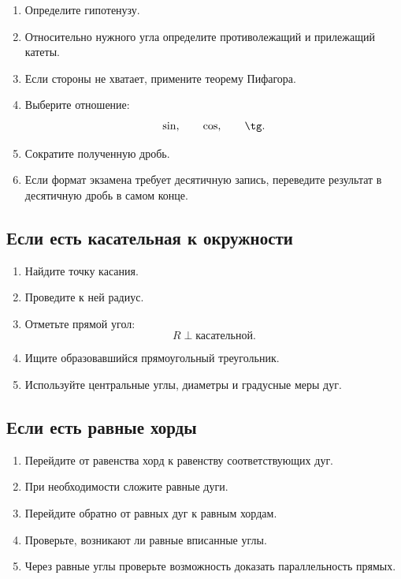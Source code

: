 \documentclass[a4paper,12pt]{article}
\begin{document}
\begin{enumerate}

  \item Определите гипотенузу.

  \item Относительно нужного угла определите
  противолежащий и прилежащий катеты.

  \item Если стороны не хватает,
  примените теорему Пифагора.

  \item Выберите отношение:
  \[
  \sin,\qquad \cos,\qquad \tg.
  \]

  \item Сократите полученную дробь.

  \item Если формат экзамена требует десятичную запись,
  переведите результат в десятичную дробь в самом конце.

\end{enumerate}

\subsection*{Если есть касательная к окружности}

\begin{enumerate}

  \item Найдите точку касания.

  \item Проведите к ней радиус.

  \item Отметьте прямой угол:
  \[
  R\perp\text{касательной}.
  \]

  \item Ищите образовавшийся прямоугольный треугольник.

  \item Используйте центральные углы,
  диаметры и градусные меры дуг.

\end{enumerate}

\subsection*{Если есть равные хорды}

\begin{enumerate}

  \item Перейдите от равенства хорд
  к равенству соответствующих дуг.

  \item При необходимости сложите равные дуги.

  \item Перейдите обратно от равных дуг
  к равным хордам.

  \item Проверьте, возникают ли
  равные вписанные углы.

  \item Через равные углы
  проверьте возможность доказать параллельность прямых.

\end{enumerate}
\end{document}
